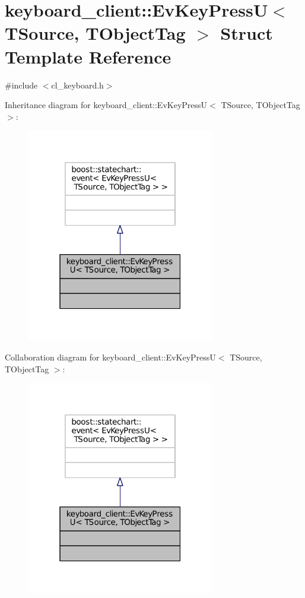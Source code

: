 \hypertarget{structkeyboard__client_1_1EvKeyPressU}{}\section{keyboard\+\_\+client\+:\+:Ev\+Key\+PressU$<$ T\+Source, T\+Object\+Tag $>$ Struct Template Reference}
\label{structkeyboard__client_1_1EvKeyPressU}


{\ttfamily \#include $<$cl\+\_\+keyboard.\+h$>$}



Inheritance diagram for keyboard\+\_\+client\+:\+:Ev\+Key\+PressU$<$ T\+Source, T\+Object\+Tag $>$\+:
\nopagebreak
\begin{figure}[H]
\begin{center}
\leavevmode
\includegraphics[width=232pt]{structkeyboard__client_1_1EvKeyPressU__inherit__graph}
\end{center}
\end{figure}


Collaboration diagram for keyboard\+\_\+client\+:\+:Ev\+Key\+PressU$<$ T\+Source, T\+Object\+Tag $>$\+:
\nopagebreak
\begin{figure}[H]
\begin{center}
\leavevmode
\includegraphics[width=232pt]{structkeyboard__client_1_1EvKeyPressU__coll__graph}
\end{center}
\end{figure}


